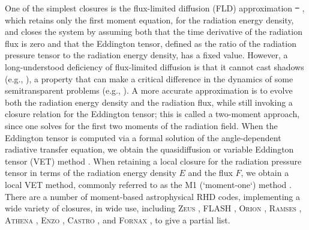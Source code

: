 \documentclass[fleqn,usenatbib]{mnras}
\providecommand{\DIFadd}[1]{{\protect\color{blue}\uwave{#1}}} %
\providecommand{\DIFdel}[1]{{\protect\color{red}\sout{#1}}}                      %
\providecommand{\DIFaddbegin}{} %
\providecommand{\DIFaddend}{} %
\providecommand{\DIFdelbegin}{} %
\providecommand{\DIFdelend}{} %
\newcommand{\DIFscaledelfig}{0.5}
\newlength{\DIFdelgraphicswidth} %
\newlength{\DIFdelgraphicsheight} %
\newcommand{\DIFaddincludegraphics}[2][]{{\color{blue}\fbox{\DIFOincludegraphics[#1]{#2}}}} %
\newcommand{\DIFdelincludegraphics}[2][]{%
\sbox{\DIFdelgraphicsbox}{\DIFOincludegraphics[#1]{#2}}%
\settoboxwidth{\DIFdelgraphicswidth}{\DIFdelgraphicsbox} %
\settoboxtotalheight{\DIFdelgraphicsheight}{\DIFdelgraphicsbox} %
\scalebox{\DIFscaledelfig}{%
\parbox[b]{\DIFdelgraphicswidth}{\usebox{\DIFdelgraphicsbox}\\[-\baselineskip] \rule{\DIFdelgraphicswidth}{0em}}\llap{\resizebox{\DIFdelgraphicswidth}{\DIFdelgraphicsheight}{%
\setlength{\unitlength}{\DIFdelgraphicswidth}%
\begin{picture}(1,1)%
\thicklines\linethickness{2pt} %
{\color[rgb]{1,0,0}\put(0,0){\framebox(1,1){}}}%
{\color[rgb]{1,0,0}\put(0,0){\line( 1,1){1}}}%
{\color[rgb]{1,0,0}\put(0,1){\line(1,-1){1}}}%
\end{picture}%
}\hspace*{3pt}}} %
} %
\DeclareRobustCommand{\DIFaddbegin}{\DIFOaddbegin \let\includegraphics\DIFaddincludegraphics} %
\DeclareRobustCommand{\DIFaddend}{\DIFOaddend \let\includegraphics\DIFOincludegraphics} %
\DeclareRobustCommand{\DIFdelbegin}{\DIFOdelbegin \let\includegraphics\DIFdelincludegraphics} %
\DeclareRobustCommand{\DIFdelend}{\DIFOaddend \let\includegraphics\DIFOincludegraphics} %
\begin{document}
One of the simplest closures is the flux-limited diffusion (FLD) approximation \DIFdelbegin \DIFdel{\mbox{%
\citep{Alme_1973}}\hspace{0pt}%
}\DIFdelend \DIFaddbegin \DIFadd{\mbox{%
\citep{LeBlanc_1970,Alme_1973}}\hspace{0pt}%
}\DIFaddend , which retains only the first moment equation, for the radiation energy density, and closes the system by assuming both that the time derivative of the radiation flux is zero and that the Eddington tensor, defined as the ratio of the radiation pressure tensor to the radiation energy density, has a fixed value. However, a long-understood deficiency of flux-limited diffusion is that it cannot cast shadows (e.g., \citealt{Hayes_2003}), a property that can make a critical difference in the dynamics of some semitransparent problems (e.g., \citealt{Davis_2014}). A more accurate approximation is to evolve both the radiation energy density and the radiation flux, while still invoking a closure relation for the Eddington tensor; this is called a two-moment approach, since one solves for the first two moments of the radiation field. When the Eddington tensor is computed via a formal solution of the angle-dependent radiative transfer equation, we obtain the quasidiffusion or variable Eddington tensor (VET) method \citep{Goldin_1964}. When retaining a local closure for the radiation pressure tensor in terms of the radiation energy density $E$ and the flux $F$, we obtain a local VET method, commonly referred to as the M1 (`moment-one`) method \citep{Minerbo_1978,Levermore_1984,Dubroca_1999,Gonzalez_2007}. There are a number of moment-based astrophysical RHD codes, implementing a wide variety of closures, in wide use, including \textsc{Zeus} \citep{Turner_2001}, \textsc{FLASH} \citep{Fryxell_2000}, \textsc{Orion} \citep{Krumholz_2007, Shestakov08a, Li21a}, \textsc{Ramses} \citep{Commercon11a, Rosdahl_2013}, \textsc{Athena} \citep{Davis_2012, Jiang12a}, \textsc{Enzo} \citep{Reynolds_2009,Bryan_2014}, \textsc{Castro} \citep{Zhang_2011,Zhang_2013,Almgren_2020}, and \textsc{Fornax} \citep{Skinner_2019}, to give a partial list.
\end{document}
